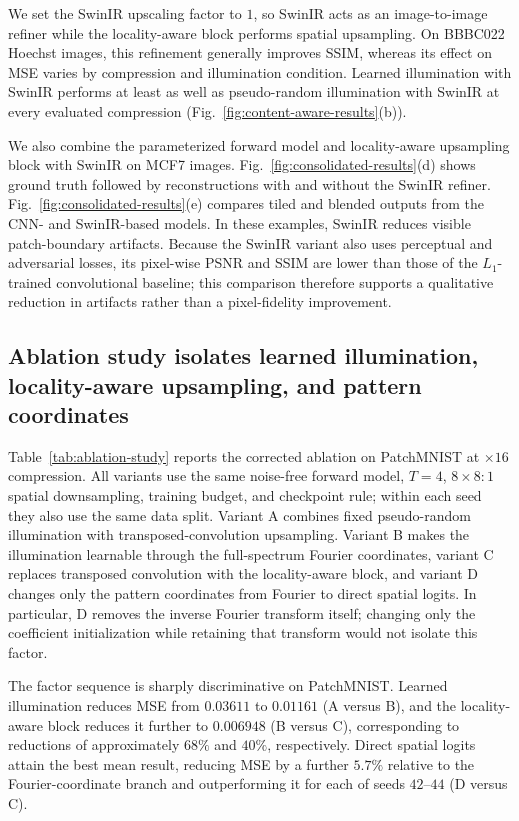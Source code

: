 \documentclass{optica-article}
\begin{document}
We set the SwinIR upscaling factor to $1$, so SwinIR acts as an image-to-image refiner while the locality-aware block performs spatial upsampling. On BBBC022 Hoechst images, this refinement generally improves SSIM, whereas its effect on MSE varies by compression and illumination condition. Learned illumination with SwinIR performs at least as well as pseudo-random illumination with SwinIR at every evaluated compression (Fig.~\ref{fig:content-aware-results}(b)).

We also combine the parameterized forward model and locality-aware upsampling block with SwinIR on MCF7 images. Fig.~\ref{fig:consolidated-results}(d) shows ground truth followed by reconstructions with and without the SwinIR refiner. Fig.~\ref{fig:consolidated-results}(e) compares tiled and blended outputs from the CNN- and SwinIR-based models. In these examples, SwinIR reduces visible patch-boundary artifacts. Because the SwinIR variant also uses perceptual and adversarial losses, its pixel-wise PSNR and SSIM are lower than those of the $L_1$-trained convolutional baseline; this comparison therefore supports a qualitative reduction in artifacts rather than a pixel-fidelity improvement.

\subsection{Ablation study isolates learned illumination, locality-aware upsampling, and pattern coordinates}
\label{sec:ablation-study}

Table~\ref{tab:ablation-study} reports the corrected ablation on PatchMNIST at $\times16$ compression. All variants use the same noise-free forward model, $T=4$, $8\times8{:}1$ spatial downsampling, training budget, and checkpoint rule; within each seed they also use the same data split. Variant A combines fixed pseudo-random illumination with transposed-convolution upsampling. Variant B makes the illumination learnable through the full-spectrum Fourier coordinates, variant C replaces transposed convolution with the locality-aware block, and variant D changes only the pattern coordinates from Fourier to direct spatial logits. In particular, D removes the inverse Fourier transform itself; changing only the coefficient initialization while retaining that transform would not isolate this factor.

The factor sequence is sharply discriminative on PatchMNIST. Learned illumination reduces MSE from $0.03611$ to $0.01161$ (A versus B), and the locality-aware block reduces it further to $0.006948$ (B versus C), corresponding to reductions of approximately $68\%$ and $40\%$, respectively. Direct spatial logits attain the best mean result, reducing MSE by a further $5.7\%$ relative to the Fourier-coordinate branch and outperforming it for each of seeds $42$--$44$ (D versus C).
\end{document}
